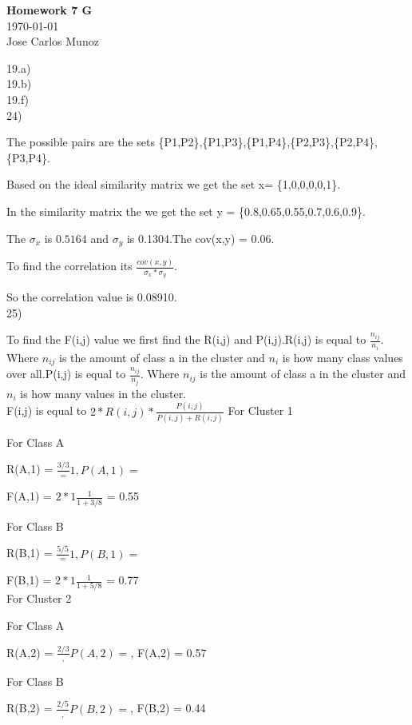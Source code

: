 \documentclass[12pt,english]{article}
\begin{document}
\begin{center}
    \Large
    \textbf{Homework 7 G}\\
    \small
    \today\\
    \large
    Jose Carlos Munoz
\end{center}%
19.a)\\

19.b)\\
19.f)\\
24)\par
The possible pairs are the sets \{P1,P2\},\{P1,P3\},\{P1,P4\},\{P2,P3\},\{P2,P4\},\{P3,P4\}.\par
Based on the ideal similarity matrix we get the set x= \{1,0,0,0,0,1\}.\par
In the  similarity matrix the we get the set y = \{0.8,0.65,0.55,0.7,0.6,0.9\}.\par
The $\sigma_x$ is $0.5164$ and $\sigma_y$ is 0.1304.The cov(x,y) = 0.06. \par
To find the correlation its $\frac{cov(x,y)}{\sigma_x * \sigma_y}$.\par
So the correlation value is 0.08910.\\
25)\par
To find the F(i,j) value we first find the R(i,j) and P(i,j).R(i,j) is equal to $\frac{n_{ij}}{n_i}$. Where $n_{ij}$ is the amount of class a in the cluster and $n_i$ is how many class values over all.P(i,j) is equal to $\frac{n_{ij}}{n_j}$. Where $n_{ij}$ is the amount of class a in the cluster and $n_i$ is how many values in the cluster.\\
F(i,j) is equal to $2 * R(i,j) * \frac{P(i,j)}{P(i,j) + R(i,j)}$
For Cluster 1\par
For Class A\par
R(A,1) = $\frac{3/3} = 1, P(A,1) = $\par
F(A,1) = $2 * 1 \frac{1}{1 + 3/8}$ = 0.55\par
For Class B\par
R(B,1) = $\frac{5/5} = 1, P(B,1) = $\par
F(B,1) = $2 * 1 \frac{1}{1 + 5/8}$ = 0.77\\
For Cluster 2\par
For Class A\par
R(A,2) = $\frac{2/3}, P(A,2) = $, F(A,2) = 0.57\par
For Class B\par
R(B,2) = $\frac{2/5}, P(B,2) = $, F(B,2) = 0.44\\
\end{document}
